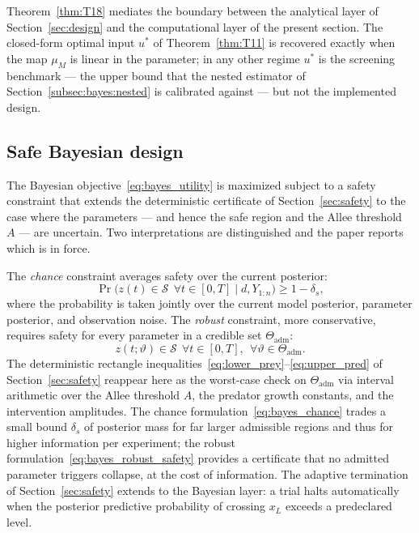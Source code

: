 \begin{remark}
Theorem~\ref{thm:T18} mediates the boundary between the analytical layer of Section~\ref{sec:design} and the computational layer of the present section. The closed-form optimal input $u^{*}$ of Theorem~\ref{thm:T11} is recovered exactly when the map $\mu_M$ is linear in the parameter; in any other regime $u^{*}$ is the screening benchmark --- the upper bound that the nested estimator of Section~\ref{subsec:bayes:nested} is calibrated against --- but not the implemented design.
\end{remark}

\subsection{Safe Bayesian design}

The Bayesian objective~\eqref{eq:bayes_utility} is maximized subject to a safety constraint that extends the deterministic certificate of Section~\ref{sec:safety} to the case where the parameters --- and hence the safe region and the Allee threshold $A$ --- are uncertain. Two interpretations are distinguished and the paper reports which is in force.

The \emph{chance} constraint averages safety over the current posterior:
\begin{equation}
\Pr\!\bigl(z(t) \in \mathcal{S}\ \ \forall t \in [0,T] \mid d, Y_{1:n}\bigr) \ge 1 - \delta_s,
\label{eq:bayes_chance}
\end{equation}
where the probability is taken jointly over the current model posterior, parameter posterior, and observation noise. The \emph{robust} constraint, more conservative, requires safety for every parameter in a credible set $\Theta_{\mathrm{adm}}$:
\begin{equation}
z(t; \vartheta) \in \mathcal{S}\ \ \forall t \in [0,T],\ \ \forall \vartheta \in \Theta_{\mathrm{adm}}.
\label{eq:bayes_robust_safety}
\end{equation}
The deterministic rectangle inequalities~\eqref{eq:lower_prey}--\eqref{eq:upper_pred} of Section~\ref{sec:safety} reappear here as the worst-case check on $\Theta_{\mathrm{adm}}$ via interval arithmetic over the Allee threshold $A$, the predator growth constants, and the intervention amplitudes. The chance formulation~\eqref{eq:bayes_chance} trades a small bound $\delta_s$ of posterior mass for far larger admissible regions and thus for higher information per experiment; the robust formulation~\eqref{eq:bayes_robust_safety} provides a certificate that no admitted parameter triggers collapse, at the cost of information. The adaptive termination of Section~\ref{sec:safety} extends to the Bayesian layer: a trial halts automatically when the posterior predictive probability of crossing $x_L$ exceeds a predeclared level.

